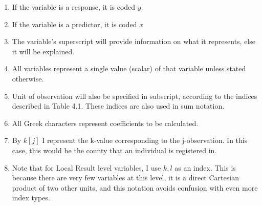 \documentclass[12pt,twoside]{reedthesis}
\providecommand{\tightlist}{%
  \setlength{\itemsep}{0pt}\setlength{\parskip}{0pt}}
\begin{document}
  \begin{enumerate}
  \def\labelenumi{\arabic{enumi}.}
  \tightlist
  \item
    If the variable is a response, it is coded \(y\).
  \item
    If the variable is a predictor, it is coded \(x\)
  \item
    The variable's superscript will provide information on what it
    represents, else it will be explained.
  \item
    All variables represent a single value (scalar) of that variable
    unless stated otherwise.
  \item
    Unit of observation will also be specified in subscript, according to
    the indices described in Table 4.1. These indices are also used in sum
    notation.
  \item
    All Greek characters represent coefficients to be calculated.
  \item
    By \(k[j]\) I represent the k-value corresponding to the
    j-observation. In this case, this would be the county that an
    individual is registered in.
  \item
    Note that for Local Result level variables, I use \(k,l\) as an index.
    This is because there are very few variables at this level, it is a
    direct Cartesian product of two other units, and this notation avoids
    confusion with even more index types.
  \end{enumerate}
  
\end{document}
